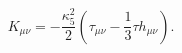 \begin{equation}
K_{\mu\nu}=-\frac{\kappa_5^2}{2}\left(\tau_{\mu\nu}-\frac{1}{3}\tau h_{\mu\nu}\right).
\end{equation}


